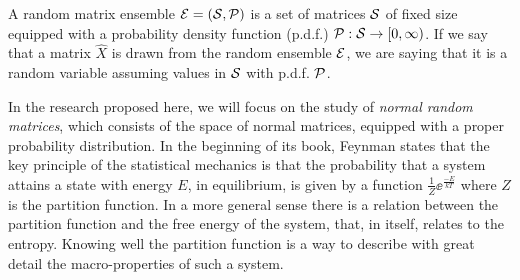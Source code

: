 \documentclass[12pt]{report}
\begin{document}
\begin{definition}
	A random matrix ensemble $\mathcal{E} = (\mathcal{S}, \mathcal{P})$ is a set of matrices $\mathcal{S}$ of fixed size equipped with a probability density function (p.d.f.) $\mathcal{P}: \mathcal{S} \rightarrow [0, \infty)$. If we say that a matrix $\hat{X}$ is drawn from the random ensemble $\mathcal{E}$, we are saying that it is a random variable assuming values in $\mathcal{S}$ with p.d.f. $\mathcal{P}$.
	\label{Def: Ensemble}
\end{definition}

In the research proposed here, we will focus on the study of {\it normal random matrices}, which consists of the space of normal matrices, equipped with a proper probability distribution. In the beginning of its book, Feynman states \cite{feynmanstatistical} that the key principle of the statistical mechanics is that the probability that a system attains a state with energy $E$, in equilibrium, is given by a function $\frac{1}{Z} \ee^{\frac{-E}{kT}}$ where $Z$ is the partition function. In a more general sense there is a relation between the partition function and the free energy of the system, that, in itself, relates to the entropy. Knowing well the partition function is a way to describe with great detail the macro-properties of such a system.
\end{document}
